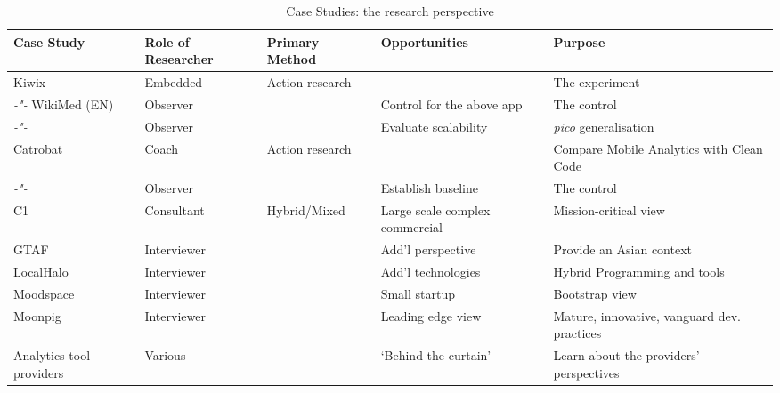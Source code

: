 \begin{table}
    \centering
    \tabcolsep=0.06cm
    \tiny
    \begin{tabular}{lllll}\toprule
    Case Study                 & Role of Researcher &  Primary Method   & Opportunities & Purpose \\
    \midrule
    Kiwix                      & Embedded           & Action research   & & The experiment \\ 
    \textit{-"-} WikiMed (EN)  & Observer           & & Control for the above app & The control  \\
    \textit{-"-}               & Observer           & & Evaluate scalability & \textit{pico} generalisation \\
    Catrobat                   & Coach              & Action research   & & Compare Mobile Analytics with Clean Code \\
     \textit{-"-}              & Observer           & & Establish baseline & The control  \\
    C1                         & Consultant         & Hybrid/Mixed & Large scale complex commercial & Mission-critical view \\
    GTAF                       & Interviewer        & & Add'l perspective & Provide an Asian context \\
    LocalHalo                  & Interviewer        & & Add'l technologies & Hybrid Programming and tools \\
    Moodspace                  & Interviewer        & & Small startup &Bootstrap view \\
    Moonpig                    & Interviewer        & & Leading edge view & Mature, innovative, vanguard dev. practices \\
    Analytics tool providers   & Various            & & `Behind the curtain' & Learn about the providers' perspectives \\
    \bottomrule
    \end{tabular}
    \caption{Case Studies: the research perspective}
    \label{tab:case-studies-research-perspective}
\end{table}


